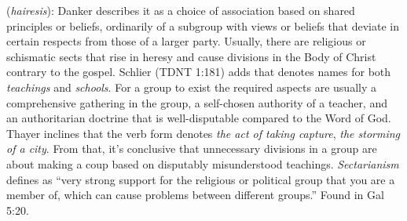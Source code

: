 \item[Sectarianism,]

(\textit{hairesis}):
Danker describes it as a choice of association based on shared principles or beliefs, ordinarily of a subgroup with views or beliefs that deviate in certain respects from those of a larger party. Usually, there are religious or schismatic sects that rise in heresy and cause divisions in the Body of Christ contrary to the gospel. Schlier (TDNT 1:181) adds that  denotes names for both \emph{teachings} and \emph{schools}. For a group to exist the required aspects are usually a comprehensive gathering in the group, a self-chosen authority of a teacher, and an authoritarian doctrine that is well-disputable compared to the Word of God. Thayer inclines that the verb form  denotes \emph{the act of taking capture}, \emph{the storming of a city}. From that, it's conclusive that unnecessary divisions in a group are about making a coup based on disputably misunderstood teachings. \emph{Sectarianism} defines as ``very strong support for the religious or political group that you are a member of, which can cause problems between different groups.''
Found in Gal 5:20.
